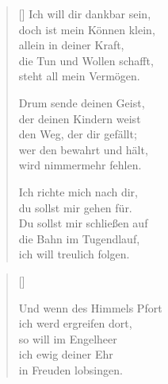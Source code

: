 \begin{multicols}{2}
\begin{verse}[\versewidth]
 Ich will dir dankbar sein,\\
doch ist mein Können klein,\\
allein in deiner Kraft,\\
die Tun und Wollen schafft,\\
steht all mein Vermögen.

 Drum sende deinen Geist,\\
der deinen Kindern weist\\
den Weg, der dir gefällt;\\
wer den bewahrt und hält,\\
wird nimmermehr fehlen.

 Ich richte mich nach dir,\\
du sollst mir gehen für.\\
Du sollst mir schließen auf\\
die Bahn im Tugendlauf,\\
ich will treulich folgen.

\end{verse}
\end{multicols}


\begin{center}
\settowidth{\versewidth}{Und wenn des Himmels Pfort}
\begin{verse}[\versewidth]

 Und wenn des Himmels Pfort\\
ich werd ergreifen dort,\\
so will im Engelheer\\
ich ewig deiner Ehr\\
in Freuden lobsingen.  
  
\end{verse}
\end{center}

